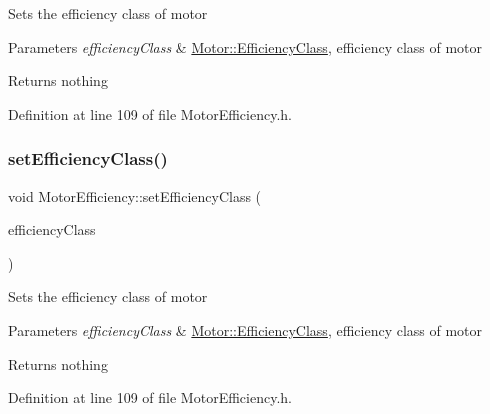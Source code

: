 Sets the efficiency class of motor


\begin{DoxyParams}{Parameters}
{\em efficiency\+Class} & \hyperlink{class_motor_afa022971ae062406a9f588c601673d4e}{Motor\+::\+Efficiency\+Class}, efficiency class of motor\\
\hline
\end{DoxyParams}
\begin{DoxyReturn}{Returns}
nothing 
\end{DoxyReturn}


Definition at line 109 of file Motor\+Efficiency.\+h.

\mbox{\label{class_motor_efficiency_a1ff4790d01bf2e65bd7bce2edc98d0c5}} 
\subsubsection{\texorpdfstring{set\+Efficiency\+Class()}{setEfficiencyClass()}\hspace{0.1cm}{\footnotesize\ttfamily [2/3]}}
{\footnotesize\ttfamily void Motor\+Efficiency\+::set\+Efficiency\+Class (\begin{DoxyParamCaption}\item[{\hyperlink{class_motor_afa022971ae062406a9f588c601673d4e}{Motor\+::\+Efficiency\+Class}}]{efficiency\+Class }\end{DoxyParamCaption})\hspace{0.3cm}{\ttfamily [inline]}}

Sets the efficiency class of motor


\begin{DoxyParams}{Parameters}
{\em efficiency\+Class} & \hyperlink{class_motor_afa022971ae062406a9f588c601673d4e}{Motor\+::\+Efficiency\+Class}, efficiency class of motor\\
\hline
\end{DoxyParams}
\begin{DoxyReturn}{Returns}
nothing 
\end{DoxyReturn}


Definition at line 109 of file Motor\+Efficiency.\+h.

\mbox{\label{class_motor_efficiency_a1ff4790d01bf2e65bd7bce2edc98d0c5}} 
